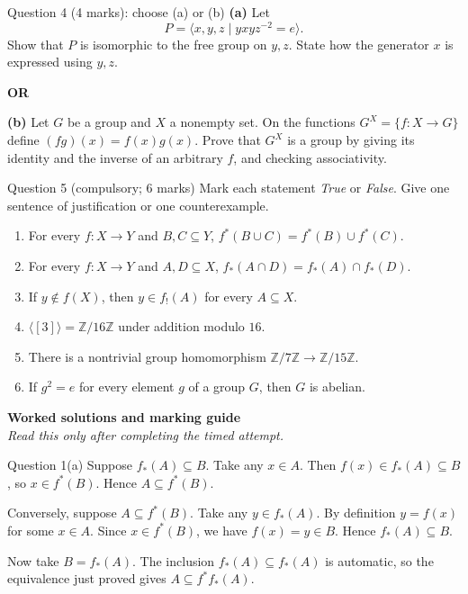 \documentclass[11pt,a4paper]{article}
\newcommand{\Z}{\mathbb Z}
\newcommand{\angles}[1]{\langle #1\rangle}
\begin{document}
\begin{examquestion}{Question 4 (4 marks): choose (a) or (b)}
\textbf{(a)} Let
\[
P=\langle x,y,z\mid yxyz^{-2}=e\rangle.
\]
Show that $P$ is isomorphic to the free group on $y,z$. State how the generator $x$ is expressed using $y,z$.

\medskip\noindent\textbf{OR}

\medskip\noindent\textbf{(b)} Let $G$ be a group and $X$ a nonempty set. On the functions $G^X=\{f:X\to G\}$ define $(fg)(x)=f(x)g(x)$. Prove that $G^X$ is a group by giving its identity and the inverse of an arbitrary $f$, and checking associativity.
\end{examquestion}

\begin{examquestion}{Question 5 (compulsory; 6 marks)}
Mark each statement \emph{True} or \emph{False}. Give one sentence of justification or one counterexample.
\begin{enumerate}[label=(\alph*)]
\item For every $f:X\to Y$ and $B,C\subseteq Y$, $f^*(B\cup C)=f^*(B)\cup f^*(C)$.
\item For every $f:X\to Y$ and $A,D\subseteq X$, $f_*(A\cap D)=f_*(A)\cap f_*(D)$.
\item If $y\notin f(X)$, then $y\in f_!(A)$ for every $A\subseteq X$.
\item $\angles{[3]}=\Z/16\Z$ under addition modulo $16$.
\item There is a nontrivial group homomorphism $\Z/7\Z\to\Z/15\Z$.
\item If $g^2=e$ for every element $g$ of a group $G$, then $G$ is abelian.
\end{enumerate}
\end{examquestion}

\clearpage
\begin{center}
{\Large\bfseries Worked solutions and marking guide}\\[.3em]
\textit{Read this only after completing the timed attempt.}
\end{center}

\begin{worked}{Question 1(a)}
Suppose $f_*(A)\subseteq B$. Take any $x\in A$. Then $f(x)\in f_*(A)\subseteq B$, so $x\in f^*(B)$. Hence $A\subseteq f^*(B)$.

Conversely, suppose $A\subseteq f^*(B)$. Take any $y\in f_*(A)$. By definition $y=f(x)$ for some $x\in A$. Since $x\in f^*(B)$, we have $f(x)=y\in B$. Hence $f_*(A)\subseteq B$.

Now take $B=f_*(A)$. The inclusion $f_*(A)\subseteq f_*(A)$ is automatic, so the equivalence just proved gives $A\subseteq f^*f_*(A)$.
\end{worked}
\end{document}
